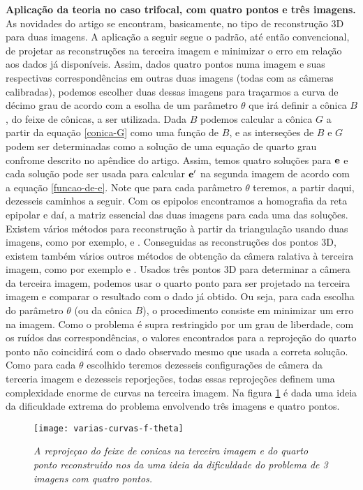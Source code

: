 {\bf Aplicação da teoria no caso trifocal, com quatro pontos e três imagens.} As novidades do artigo se encontram, basicamente, no tipo de reconstrução 3D para duas imagens. A aplicação a seguir segue o padrão, até então convencional, de projetar as reconstruções na terceira imagem e minimizar o erro em relação aos dados já disponíveis. Assim, dados quatro pontos numa imagem e suas respectivas correspondências em outras duas imagens (todas com as câmeras calibradas), podemos escolher duas dessas imagens para traçarmos a curva de décimo grau de acordo com a esolha de um parâmetro $\theta$ que irá definir a cônica $B$, do feixe de cônicas, a ser utilizada.  Dada $B$ podemos calcular a cônica $G$ a partir da equação \ref{conica-G} como uma função de $B$, e as interseções de $B$ e $G$ podem ser determinadas como a solução de uma equação de quarto grau confrome descrito no apêndice do artigo. Assim, temos quatro soluções para   ${\bf e}$ e cada solução pode ser usada para calcular ${\bf e'}$ na segunda imagem de acordo com a equação \ref{funcao-de-e}. Note que para cada parâmetro $\theta$ teremos, a partir daqui, dezesseis caminhos a seguir. Com os epipolos encontramos a homografia da reta epipolar  e daí, a matriz essencial das duas imagens para cada uma das soluções. Existem vários métodos para reconstrução à partir da triangulação usando duas imagens, como por exemplo, \cite{nister5p2v} e \cite{Fabbri:Kimia:IJCV2015}. Conseguidas as reconstruções dos pontos 3D, existem também vários outros métodos de obtenção da câmera ralativa à terceira imagem, como por exemplo \cite{haralick} e \cite{bib:kuang}. Usados três pontos 3D para determinar a câmera da terceira imagem, podemos usar o quarto ponto para ser projetado na terceira imagem e comparar o resultado com o dado já obtido. Ou seja, para cada escolha do parâmetro $\theta$ (ou da cônica $B$), o procedimento consiste em minimizar um erro na imagem. Como o problema é supra restringido por um grau de liberdade, com os ruídos das correspondências, o valores encontrados para a reprojeção do quarto ponto não coincidirá com o dado observado mesmo que usada a correta solução. Como para cada $\theta$ escolhido teremos dezesseis configurações de câmera da terceria imagem e dezesseis reporjeções, todas essas reprojeções definem uma complexidade enorme de curvas na terceira imagem. Na figura \ref{curvas-f(theta)} é dada uma ideia da dificuldade extrema do problema envolvendo três imagens e quatro pontos. 

\begin{figure}[!htb]
\centering
\texttt{[image: varias-curvas-f-theta]}
\caption{\textit{A reprojeçao do feixe de conicas na terceira imagem e do quarto ponto reconstruido nos da uma ideia da dificuldade do problema de 3 imagens com quatro pontos.}}
\label{curvas-f(theta)}
\end{figure}

